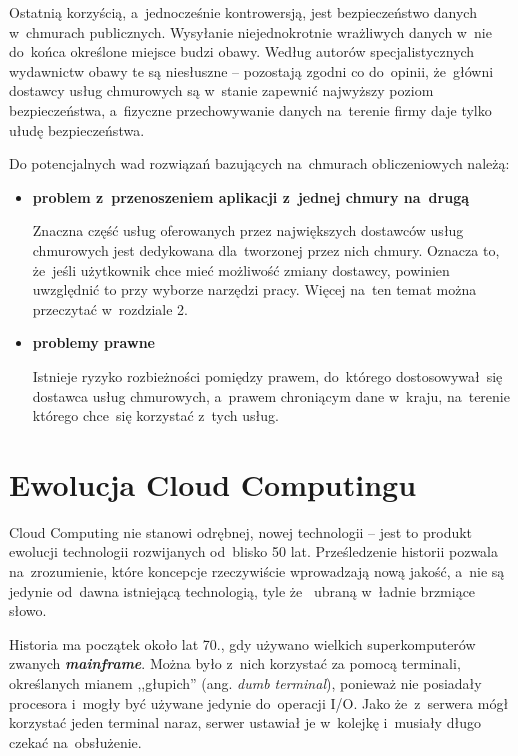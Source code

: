 \documentclass[12pt,a4paper,twoside,titlepage,openright]{book}
\begin{document}
Ostatnią korzyścią, a~jednocześnie kontrowersją, jest bezpieczeństwo danych w~chmurach publicznych. Wysyłanie niejednokrotnie wrażliwych danych w~nie do~końca określone miejsce budzi obawy. Według autorów specjalistycznych wydawnictw\cite{ccCambridge,ccBiznes} obawy te są niesłuszne -- pozostają zgodni co do~opinii, że~główni dostawcy usług chmurowych są w~stanie zapewnić najwyższy poziom bezpieczeństwa, a~fizyczne przechowywanie danych na~terenie firmy daje tylko ułudę bezpieczeństwa.

Do potencjalnych wad rozwiązań bazujących na~chmurach obliczeniowych należą:

\begin{itemize}

\item \textbf{problem z~przenoszeniem aplikacji z~jednej chmury na~drugą}

Znaczna część usług oferowanych przez największych dostawców usług chmurowych jest dedykowana dla~tworzonej przez nich chmury. Oznacza to, że~jeśli użytkownik chce mieć możliwość zmiany dostawcy, powinien uwzględnić to przy wyborze narzędzi pracy. Więcej na~ten temat można przeczytać w~rozdziale 2.

\item \textbf{problemy prawne}

Istnieje ryzyko rozbieżności pomiędzy prawem, do~którego dostosowywał~się dostawca usług chmurowych, a~prawem chroniącym dane w~kraju, na~terenie którego chce~się korzystać z~tych usług. 

\end{itemize}


\section{Ewolucja Cloud Computingu}

Cloud Computing nie stanowi odrębnej, nowej technologii -- jest to produkt ewolucji technologii rozwijanych od~blisko 50 lat. Prześledzenie historii pozwala na~zrozumienie, które koncepcje rzeczywiście wprowadzają nową jakość, a~nie są jedynie od~dawna istniejącą technologią, tyle że~ ubraną w~ładnie brzmiące słowo.


Historia ma początek około lat 70., gdy używano wielkich superkomputerów zwanych \textbf{\textit{mainframe}}. Można było z~nich korzystać za pomocą terminali, określanych mianem ,,głupich'' (ang. \textit{dumb terminal}), ponieważ nie posiadały procesora i~mogły być używane jedynie do~operacji I/O. Jako że~z~serwera mógł korzystać jeden terminal naraz, serwer ustawiał je w~kolejkę i~musiały długo czekać na~obsłużenie.
\end{document}
